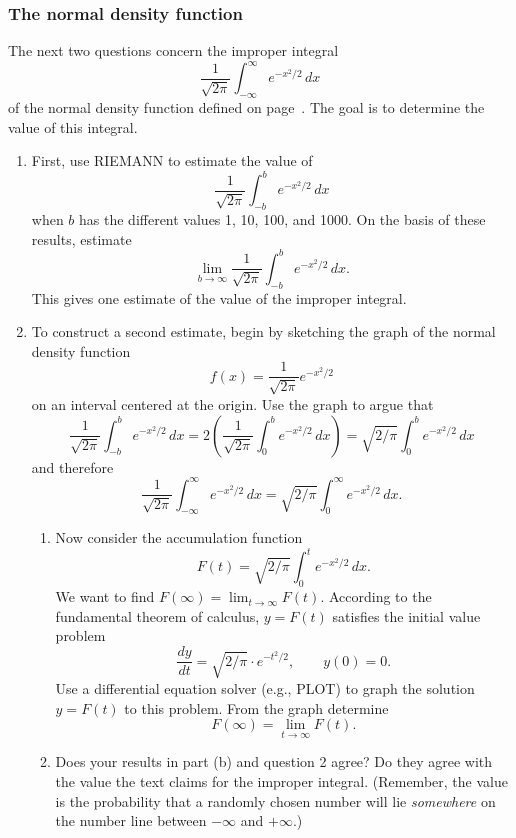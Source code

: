 \subsubsection{The normal density function}
\label{subsubsec:the-normal-density-function}

The next two questions concern the improper integral
	\[
\dfrac{1}{\sqrt{2\pi}} \int_{-\infty}^{\infty}
		e^{-x^2/2} \, dx
\]
of the normal density function defined on page~\pageref{`normal'}.  The goal is to determine the value of this integral.


\begin{enumerate}
\item First, use RIEMANN to estimate
the value of
	\[
\dfrac{1}{\sqrt{2\pi}} \int_{-b}^{b}
		e^{-x^2/2} \, dx
\]
when $b$ has the different values 1, 10, 100, and 1000.  On the basis
of these results, estimate
	\[
\lim_{b \to \infty} \dfrac{1}{\sqrt{2\pi}} \int_{-b}^{b}
		e^{-x^2/2} \, dx.
\]
This gives one estimate of the value of the improper integral.


\item To construct a second estimate, begin by sketching the graph of
the normal density function
	\[
f(x) = \dfrac{1}{\sqrt{2\pi}} e^{-x^2/2}
\]
on an interval centered at the origin.  Use the graph to argue that 
	\[
\dfrac{1}{\sqrt{2\pi}} \int_{-b}^{b}
		e^{-x^2/2} \, dx =
	2 \left( \dfrac{1}{\sqrt{2\pi}} \int_{0}^{b}
		e^{-x^2/2} \, dx \right) =
	\sqrt{2/\pi} \int_{0}^{b}
		e^{-x^2/2} \, dx
\]
and therefore
	\[
\dfrac{1}{\sqrt{2\pi}} \int_{-\infty}^{\infty}
		e^{-x^2/2} \, dx =
	\sqrt{2/\pi} \int_{0}^{\infty}
		e^{-x^2/2} \, dx.
\]


  \begin{enumerate}
  \item Now consider the accumulation function
\[
F(t) = \sqrt{2/\pi} \int_{0}^{t} e^{-x^2/2} \, dx.
\]
We want to find $F(\infty) = {\displaystyle \lim_{t \to \infty}
  F(t)}$.  According to the fundamental theorem of calculus, $y =
F(t)$ satisfies the initial value problem
	\[
\dfrac{dy}{dt} = \sqrt{2/\pi} \cdot
		e^{-t^2/2}, \qquad
		y(0) = 0.
\]
Use a differential equation solver (e.g., PLOT)
to graph the solution $y = F(t)$ to this problem.  From the graph
determine
	\[
F(\infty) = \lim_{t \to \infty} F(t).
\]


  \item Does your results in part (b) and question 2 agree?  Do they
agree with the value the text claims for the improper integral.
(Remember, the value is the probability that a randomly chosen number
will lie {\em somewhere\/} on the number line between $-\infty$ and
$+\infty$.)


\end{enumerate}
\end{enumerate}
